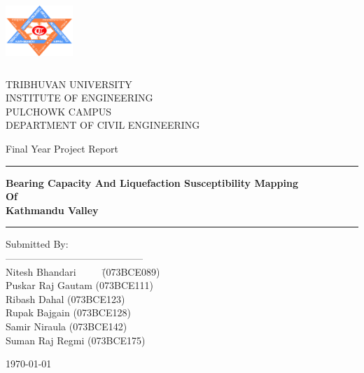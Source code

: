 \begin{titlepage}
	\centering
	\includegraphics[height=1in,width=1in]{images/main/logo.png}
	\par
	\begin{large}
		TRIBHUVAN UNIVERSITY\\
		INSTITUTE OF ENGINEERING\\
		PULCHOWK CAMPUS\\
		DEPARTMENT OF CIVIL ENGINEERING
	\end{large}
	\vfill
	\par
	\begin{large}
		Final Year Project Report
	\end{large}
\rule{\textwidth}{0.4pt}
	\begin{Large}\bfseries
		Bearing Capacity And Liquefaction Susceptibility Mapping\\
		Of \\
		Kathmandu Valley
	\end{Large}
\rule{\textwidth}{0.4pt}
	\vfill
	\begin{minipage}[t]{0.48\linewidth}
		\vspace{0pt}
		 \begin{tabbing}
			Submitted By:\\
			------------------------------------------\\
			Nitesh Bhandari ~~~~ \=  (073BCE089)\\
			Puskar Raj Gautam \>  (073BCE111)\\
			Ribash Dahal \>  (073BCE123)\\
			Rupak Bajgain \> (073BCE128)\\
			Samir Niraula \> (073BCE142)\\
			Suman Raj Regmi \> (073BCE175)
		\end{tabbing}
	\end{minipage}
  \vfill
  \today
\end{titlepage}